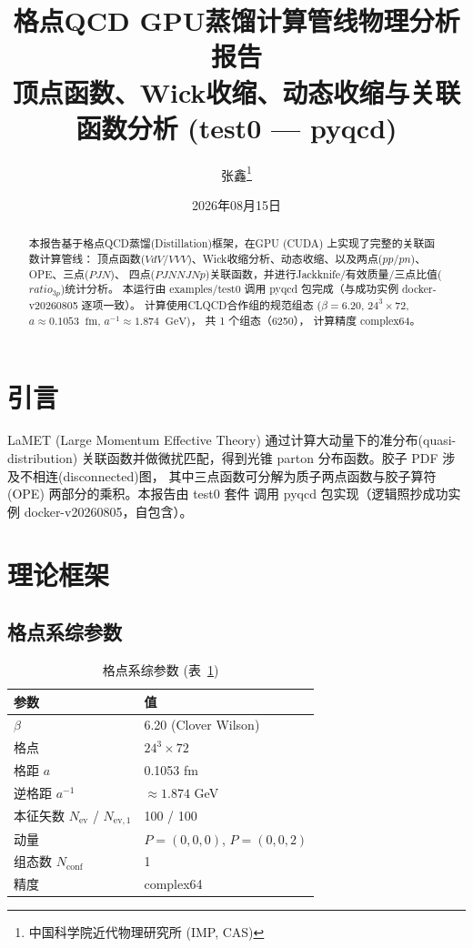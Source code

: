 \documentclass[11pt,a4paper]{article}
\title{\textbf{格点QCD GPU蒸馏计算管线物理分析报告}\\[0.3em]
       \large 顶点函数、Wick收缩、动态收缩与关联函数分析 (test0 — pyqcd)}
\author{张鑫\thanks{中国科学院近代物理研究所 (IMP, CAS)}}
\date{2026年08月15日}
\newcommand{\gev}{\;\mathrm{GeV}}
\newcommand{\fm}{\;\mathrm{fm}}
\newcommand{\Nconf}{N_{\mathrm{conf}}}
\newcommand{\Nev}{N_{\mathrm{ev}}}
\newcommand{\apm}{a^{-1}}
\begin{document}
\maketitle

\begin{abstract}
本报告基于格点QCD蒸馏(Distillation)框架，在GPU (CUDA) 上实现了完整的关联函数计算管线：
顶点函数($VdV$/$VVV$)、Wick收缩分析、动态收缩、以及两点($pp$/$pn$)、OPE、三点($PJN$)、
四点($PJNNJNp$)关联函数，并进行Jackknife/有效质量/三点比值($ratio_{3p}$)统计分析。
本运行由 examples/test0 调用 pyqcd 包完成（与成功实例 docker-v20260805 逐项一致）。
计算使用CLQCD合作组的规范组态
($\beta=6.20$, $24^3\times72$, $a\approx0.1053\;\fm$, $\apm\approx1.874\;\gev$)，
共 1 个组态（6250），
计算精度 complex64。
\end{abstract}

\tableofcontents
\newpage

\section{引言}
LaMET (Large Momentum Effective Theory) 通过计算大动量下的准分布(quasi-distribution)
关联函数并做微扰匹配，得到光锥 parton 分布函数。胶子 PDF 涉及不相连(disconnected)图，
其中三点函数可分解为质子两点函数与胶子算符 (OPE) 两部分的乘积。本报告由 test0 套件
调用 pyqcd 包实现（逻辑照抄成功实例 docker-v20260805，自包含）。

\section{理论框架}
\subsection{格点系综参数}
\begin{table}[h]
\centering
\caption{格点系综参数 (表~\ref{tab:ensemble})}
\label{tab:ensemble}
\begin{tabular}{ll}
\toprule
参数 & 值 \\
\midrule
$\beta$ & 6.20 (Clover Wilson) \\
格点 & $24^3\times72$ \\
格距 $a$ & 0.1053 fm \\
逆格距 $\apm$ & $\approx 1.874$ GeV \\
本征矢数 $\Nev$ / $N_{\mathrm{ev,1}}$ & 100 / 100 \\
动量 & $P=(0,0,0)$, $P=(0,0,2)$ \\
组态数 $\Nconf$ & 1 \\
精度 & complex64 \\
\bottomrule
\end{tabular}
\end{table}
\end{document}
